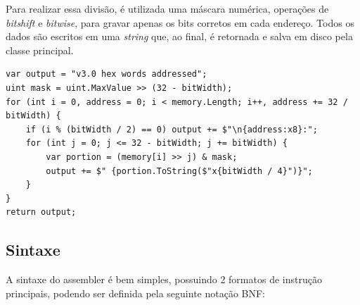 \documentclass[
	article,			%
	11pt,				%
	oneside,			%
	a4paper,			%
	english,			%
	brazil,				%
	sumario=tradicional
	]{abntex2}
\begin{document}
Para realizar essa divisão, é utilizada uma máscara numérica, operações de \textit{bitshift} e \textit{bitwise}, para gravar apenas os bits corretos em cada endereço. Todos os dados são escritos em uma \textit{string} que, ao final, é retornada e salva em disco pela classe principal.

\begin{lstlisting}
var output = "v3.0 hex words addressed";
uint mask = uint.MaxValue >> (32 - bitWidth);
for (int i = 0, address = 0; i < memory.Length; i++, address += 32 / bitWidth) {
    if (i % (bitWidth / 2) == 0) output += $"\n{address:x8}:";
    for (int j = 0; j <= 32 - bitWidth; j += bitWidth) {
        var portion = (memory[i] >> j) & mask;
        output += $" {portion.ToString($"x{bitWidth / 4}")}";
    }
}
return output;
\end{lstlisting}
\subsection{Sintaxe}\label{sec:sintaxeAssembler}

A sintaxe do assembler é bem simples, possuindo 2 formatos de instrução principais, podendo ser definida pela seguinte notação BNF:
\end{document}
